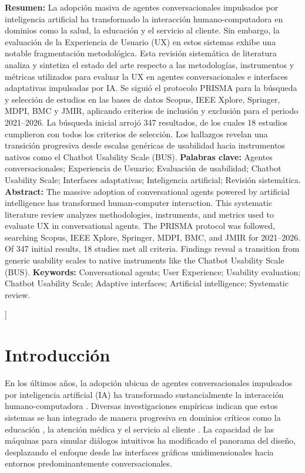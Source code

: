 \documentclass[11pt,twocolumn]{article}
\begin{document}
\begin{@twocolumnfalse}
\noindent\textbf{Resumen:} 
La adopción masiva de agentes conversacionales impulsados por inteligencia artificial ha transformado la interacción humano-computadora en dominios como la salud, la educación y el servicio al cliente. Sin embargo, la evaluación de la Experiencia de Usuario (UX) en estos sistemas exhibe una notable fragmentación metodológica. Esta revisión sistemática de literatura analiza y sintetiza el estado del arte respecto a las metodologías, instrumentos y métricas utilizados para evaluar la UX en agentes conversacionales e interfaces adaptativas impulsadas por IA. Se siguió el protocolo PRISMA para la búsqueda y selección de estudios en las bases de datos Scopus, IEEE Xplore, Springer, MDPI, BMC y JMIR, aplicando criterios de inclusión y exclusión para el periodo 2021--2026. La búsqueda inicial arrojó 347 resultados, de los cuales 18 estudios cumplieron con todos los criterios de selección. Los hallazgos revelan una transición progresiva desde escalas genéricas de usabilidad hacia instrumentos nativos como el Chatbot Usability Scale (BUS).
\vspace{0.3cm}
\noindent\textbf{Palabras clave:} Agentes conversacionales; Experiencia de Usuario; Evaluación de usabilidad; Chatbot Usability Scale; Interfaces adaptativas; Inteligencia artificial; Revisión sistemática.
\vspace{0.3cm}
\noindent\textbf{Abstract:} 
The massive adoption of conversational agents powered by artificial intelligence has transformed human-computer interaction. This systematic literature review analyzes methodologies, instruments, and metrics used to evaluate UX in conversational agents. The PRISMA protocol was followed, searching Scopus, IEEE Xplore, Springer, MDPI, BMC, and JMIR for 2021--2026. Of 347 initial results, 18 studies met all criteria. Findings reveal a transition from generic usability scales to native instruments like the Chatbot Usability Scale (BUS).
\vspace{0.3cm}
\noindent\textbf{Keywords:} Conversational agents; User Experience; Usability evaluation; Chatbot Usability Scale; Adaptive interfaces; Artificial intelligence; Systematic review.
\vspace{0.8cm}
\end{@twocolumnfalse}
]

\section{Introducción}

En los últimos años, la adopción ubicua de agentes conversacionales impulsados por inteligencia artificial (IA) ha transformado sustancialmente la interacción humano-computadora \cite{folstad2021}. Diversas investigaciones empíricas indican que estos sistemas se han integrado de manera progresiva en dominios críticos como la educación \cite{kuhail2022, belda2023}, la atención médica \cite{he2022, fan2023, chung2021} y el servicio al cliente \cite{jannach2022}. La capacidad de las máquinas para simular diálogos intuitivos ha modificado el panorama del diseño, desplazando el enfoque desde las interfaces gráficas unidimensionales hacia entornos predominantemente conversacionales.
\end{document}
